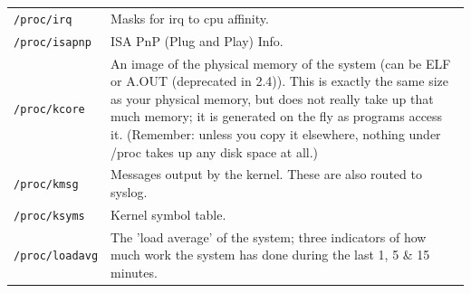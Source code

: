 \documentclass[a4paper]{article}
\begin{document}
\begin{table}
\begin{tabular}{@{}lp{8cm}@{}}
\texttt{/proc/irq} &
Masks for irq to cpu affinity.\\

\texttt{/proc/isapnp} &
ISA PnP (Plug and Play) Info.\\

\texttt{/proc/kcore} &
An image of the physical memory of the system (can be ELF or A.OUT (deprecated in 2.4)). This is exactly the same size as your physical memory, but does not really take up that much memory; it is generated on the fly as programs access it. (Remember: unless you copy it elsewhere, nothing under /proc takes up any disk space at all.)\\

\texttt{/proc/kmsg} &
Messages output by the kernel. These are also routed to syslog.\\

\texttt{/proc/ksyms} &
Kernel symbol table.\\

\texttt{/proc/loadavg} &
The 'load average' of the system; three indicators of how much work the system has done during the last 1, 5 \& 15 minutes.\\
\bottomrule
\end{tabular}
\end{table}
\end{document}
